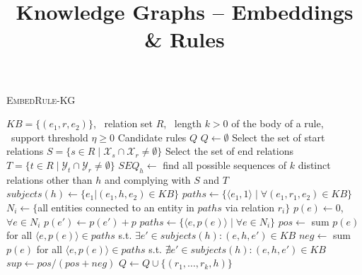 \documentclass[a4paper,9pt]{article}
\begin{document}
\title{Knowledge Graphs -- Embeddings \& Rules}


\author{\vspace{10mm}}

\maketitle 



\begin{algorithm}[h!]
\caption{\textsc{EmbedRule-KG}}
\label{alg:embedrulekg}
\begin{algorithmic}[1]
\small
\REQUIRE $KB = \{(e_1,r, e_2)\}$, \ relation set $R$, \ length $k > 0$ of the body of a rule, \ support threshold $\eta \geq 0$
\ENSURE Candidate rules $Q$
\STATE $Q \gets \emptyset$
	\STATE Select the set of start relations $S = \{s \in R \mid \mathcal{X}_s \cap \mathcal{X}_r \neq \emptyset\}$
	\STATE Select the set of end relations $T = \{t \in R \mid \mathcal{Y}_t \cap \mathcal{Y}_r \neq \emptyset\}$
	\STATE $SEQ_h \gets $ find all possible sequences of $k$ distinct relations other than $h$ and complying with $S$ and $T$ 
	\vspace{1mm}
	\\
	\STATE $subjects(h) \gets \{e_1 | (e_1,h,e_2) \in KB\}$
		\STATE $paths \gets \{\langle e_1, 1 \rangle \mid \forall(e_1,r_1,e_2) \in KB \}$
			\STATE $N_i \gets \{$all entities connected to an entity in $paths$ via relation $r_i\}$
			\STATE $p(e) \gets 0$, \ $\forall e \in N_i$
				\STATE $p(e') \gets p(e') + p$
			\ENDFOR
			\STATE $paths \gets \{\langle e, p(e) \rangle \mid \forall e \in N_i \}$
		\ENDFOR
		\STATE $pos \gets $ sum $p(e)$ for all $\langle e, p(e) \rangle \in paths$ s.t. $\exists e' \in subjects(h) : (e,h,e') \in KB$
		\STATE $neg \gets $ sum $p(e)$ for all $\langle e, p(e) \rangle \in paths$ s.t. $\nexists e' \in subjects(h) : (e,h,e') \in KB$
		\STATE $sup \gets pos/(pos+neg)$
			\STATE $Q \gets Q \cup \{(r_1, \ldots, r_k, h)\}$
		\ENDIF 
	\ENDFOR
\ENDFOR
\end{algorithmic}
\end{algorithm}
\end{document}
